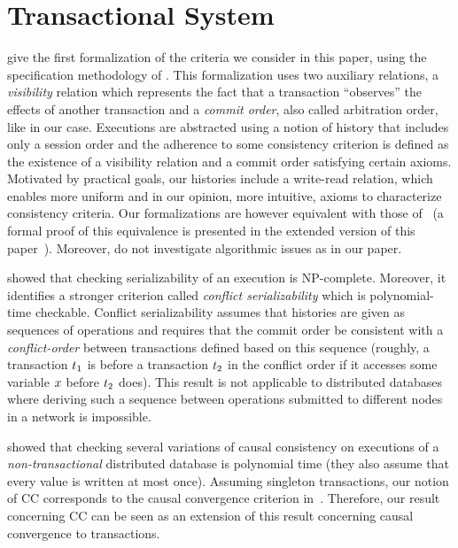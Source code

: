 
\section{Transactional System}

\cite{DBLP:conf/concur/Cerone0G15} give the first formalization of the criteria we consider in this paper, using the specification methodology of \cite{DBLP:conf/popl/BurckhardtGYZ14}. This formalization uses two auxiliary relations, a \emph{visibility} relation which represents the fact that a transaction ``observes'' the effects of another transaction and a \emph{commit order}, also called arbitration order, like in our case. Executions are abstracted using a notion of history that includes only a session order and the adherence to some consistency criterion is defined as the existence of a visibility relation and a commit order satisfying certain axioms. Motivated by practical goals, our histories include a write-read relation, which enables more uniform and in our opinion, more intuitive, axioms to characterize consistency criteria. Our formalizations are however equivalent with those of~\cite{DBLP:conf/concur/Cerone0G15} (a formal proof of this equivalence is presented in the extended version of this paper~\cite{arxiv}). Moreover, \cite{DBLP:conf/concur/Cerone0G15} do not investigate algorithmic issues as in our paper.

\cite{DBLP:journals/jacm/Papadimitriou79b} showed that checking serializability of an execution is NP-complete. Moreover, it identifies a stronger criterion called \emph{conflict serializability} which is polynomial-time checkable. Conflict serializability assumes that histories are given as sequences of operations and requires that the commit order be consistent with a \emph{conflict-order} between transactions defined based on this sequence (roughly, a transaction ${t}_1$ is before a transaction ${t}_2$ in the conflict order if it accesses some variable ${x}$ before ${t}_2$ does). This result is not applicable to distributed databases where deriving such a sequence between operations submitted to different nodes in a network is impossible.

\cite{DBLP:conf/popl/BouajjaniEGH17} showed that checking several variations of causal consistency on executions of a \emph{non-transactional} distributed database is polynomial time (they also assume that every value is written at most once). 
Assuming singleton transactions, our notion of CC corresponds to the causal convergence criterion in~\cite{DBLP:conf/popl/BouajjaniEGH17}. Therefore, our result concerning CC can be seen as an extension of this result concerning causal convergence to transactions.

